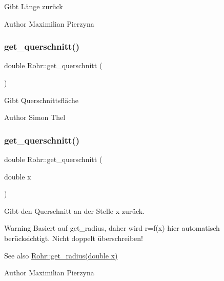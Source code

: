 Gibt Länge zurück \begin{DoxyAuthor}{Author}
Maximilian Pierzyna 
\end{DoxyAuthor}
\mbox{\label{class_rohr_a6763a65cfe3992b6dd4baa903ae44b29}} 
\subsubsection{\texorpdfstring{get\+\_\+querschnitt()}{get\_querschnitt()}\hspace{0.1cm}{\footnotesize\ttfamily [1/2]}}
{\footnotesize\ttfamily double Rohr\+::get\+\_\+querschnitt (\begin{DoxyParamCaption}{ }\end{DoxyParamCaption})}

Gibt Querschnittsfläche \begin{DoxyAuthor}{Author}
Simon Thel 
\end{DoxyAuthor}
\mbox{\label{class_rohr_ab8c1e474c5b1510a7c52cb805260ab15}} 
\subsubsection{\texorpdfstring{get\+\_\+querschnitt()}{get\_querschnitt()}\hspace{0.1cm}{\footnotesize\ttfamily [2/2]}}
{\footnotesize\ttfamily double Rohr\+::get\+\_\+querschnitt (\begin{DoxyParamCaption}\item[{double}]{x }\end{DoxyParamCaption})}



Gibt den Querschnitt an der Stelle x zurück. 

\begin{DoxyWarning}{Warning}
Basiert auf get\+\_\+radius, daher wird r=f(x) hier automatisch berücksichtigt. Nicht doppelt überschreiben! 
\end{DoxyWarning}
\begin{DoxySeeAlso}{See also}
\hyperlink{class_rohr_a427e4ad6d350912715bd6796e385eaf3}{Rohr\+::get\+\_\+radius(double x)}
\end{DoxySeeAlso}
\begin{DoxyAuthor}{Author}
Maximilian Pierzyna 
\end{DoxyAuthor}
\mbox{\label{class_rohr_a273b05707337661cfaab228a670350f2}} 
